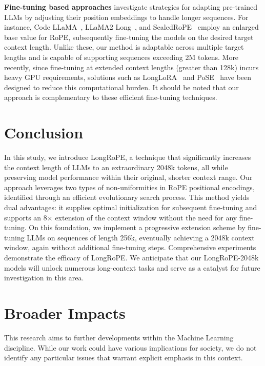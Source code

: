 \textbf{Fine-tuning based approaches} investigate strategies for adapting pre-trained LLMs by adjusting their position embeddings to handle longer sequences. For instance, Code LLaMA~\cite{codellama}, LLaMA2 Long~\cite{xiong2023effective}, and ScaledRoPE~\cite{liu2023scaling} employ an enlarged base value for RoPE, subsequently fine-tuning the models on the desired target context length. Unlike these, our method is adaptable across multiple target lengths and is capable of supporting sequences exceeding 2M tokens. More recently, since fine-tuning at extended context lengths (greater than 128k) incurs heavy GPU requirements, solutions such as LongLoRA~\cite{longlora} and PoSE~\cite{zhu2023pose} have been designed to reduce this computational burden. It should be noted that our approach is complementary to these efficient fine-tuning techniques.

\section{Conclusion}

In this study, we introduce LongRoPE, a technique that significantly increases the context length of LLMs to an extraordinary 2048k tokens, all while preserving model performance within their original, shorter context range. Our approach leverages two types of non-uniformities in RoPE positional encodings, identified through an efficient evolutionary search process. This method yields dual advantages: it supplies optimal initialization for subsequent fine-tuning and supports an 8$\times$ extension of the context window without the need for any fine-tuning. On this foundation, we implement a progressive extension scheme by fine-tuning LLMs on sequences of length 256k, eventually achieving a 2048k context window, again without additional fine-tuning steps. Comprehensive experiments demonstrate the efficacy of LongRoPE. We anticipate that our LongRoPE-2048k models will unlock numerous long-context tasks and serve as a catalyst for future investigation in this area.

\section*{Broader Impacts} This research aims to further developments within the Machine Learning discipline. While our work could have various implications for society, we do not identify any particular issues that warrant explicit emphasis in this context.

	\balance

